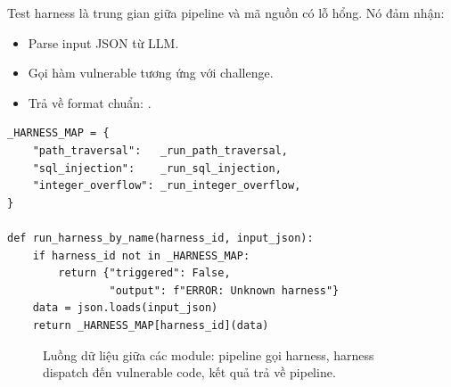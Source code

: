 \documentclass{nt521report}
\begin{document}
Test harness là trung gian giữa pipeline và mã nguồn có lỗ hổng. Nó đảm nhận:
\begin{itemize}
  \item Parse input JSON từ LLM.
  \item Gọi hàm vulnerable tương ứng với challenge.
  \item Trả về format chuẩn: .
\end{itemize}

\begin{lstlisting}[style=Python, caption={Dispatcher pattern trong test\_harness.py}]
_HARNESS_MAP = {
    "path_traversal":   _run_path_traversal,
    "sql_injection":    _run_sql_injection,
    "integer_overflow": _run_integer_overflow,
}

def run_harness_by_name(harness_id, input_json):
    if harness_id not in _HARNESS_MAP:
        return {"triggered": False,
                "output": f"ERROR: Unknown harness"}
    data = json.loads(input_json)
    return _HARNESS_MAP[harness_id](data)
\end{lstlisting}

\begin{figure}[H]
  \centering
  \caption{Luồng dữ liệu giữa các module: pipeline gọi harness, harness dispatch đến vulnerable code, kết quả trả về pipeline.}
  \label{fig:module-flow}
\end{figure}
\end{document}
